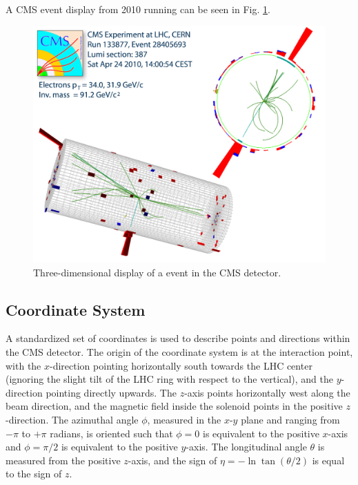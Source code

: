 A CMS event display from 2010 running can be seen in Fig. \ref{fig:EventDisplay}.  

 \begin{figure}[htb]
  \begin{center}
    \includegraphics[width=360pt]{Figures/zee-133877-28405693-full.png}
  \end{center}
  \caption[\fixspacing Three-dimensional display of a \Zee event in the CMS detector]
	  {\fixspacing Three-dimensional display of a \Zee event in the CMS detector.}
  \label{fig:EventDisplay}
 \end{figure}

\subsection{Coordinate System} %
\label{exp:coords}
A standardized set of coordinates is used to describe points and directions within the CMS detector.  
The origin of the coordinate system is at the interaction point,
with the $x$-direction pointing horizontally south towards the LHC center
(ignoring the slight tilt of the LHC ring with respect to the vertical),
and the $y$-direction pointing directly upwards.  
The $z$-axis points horizontally west along the beam direction,
and the magnetic field inside the solenoid points in the positive $z$-direction.  
The azimuthal angle $\phi$, measured in the $x$-$y$ plane and ranging from $-\pi$ to $+\pi$ radians, 
is oriented such that $ \phi = 0 $ is equivalent to the positive $x$-axis
and $ \phi = \pi/2 $ is equivalent to the positive $y$-axis.  
The longitudinal angle $\theta$ is measured from the positive $z$-axis, 
and the sign of $ \eta = -\ln\tan(\theta/2)$ is equal to the sign of $z$.  

